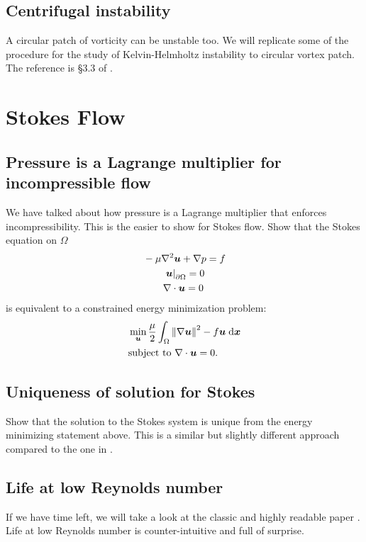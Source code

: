 \documentclass[11pt,letterpaper]{report}
\begin{document}
\section{Centrifugal instability}
A circular patch of vorticity can be unstable too. We will replicate some of the procedure for the study of Kelvin-Helmholtz instability to circular vortex patch. The reference is \S 3.3 of \cite{McWilliams_06}.

\chapter{Stokes Flow}
\section{Pressure is a Lagrange multiplier for incompressible flow}
We have talked about how pressure is a Lagrange multiplier that enforces incompressibility. This is the easier to show for Stokes flow. Show that the Stokes equation on $\Omega$
\begin{align}
    &-\mu\nabla^2 \boldsymbol{u} + \nabla p = f\\
    &\qquad \left.\boldsymbol{u}\right|_{\partial\Omega} = 0\\
    &\qquad\nabla\cdot \boldsymbol{u} = 0
\end{align}
is equivalent to a constrained energy minimization problem:
\begin{align}
    &\min_{\boldsymbol{u}} \frac{\mu}{2}\int_\Omega \left\Vert \nabla\boldsymbol{u} \right\Vert^2-f\boldsymbol{u}\;\mathrm{d} \boldsymbol{x}\\
    &\text{subject to }\nabla\cdot \boldsymbol{u} = 0.
\end{align}

\section{Uniqueness of solution for Stokes}
Show that the solution to the Stokes system is unique from the energy minimizing statement above. This is a similar but slightly different approach compared to the one in \cite[\S 7.4]{Acheson_90}. 

\section{Life at low Reynolds number}
If we have time left, we will take a look at the classic and highly readable paper \cite{Purcell_77}. Life at low Reynolds number is counter-intuitive and full of surprise.



\newpage
\printbibliography
\end{document}
